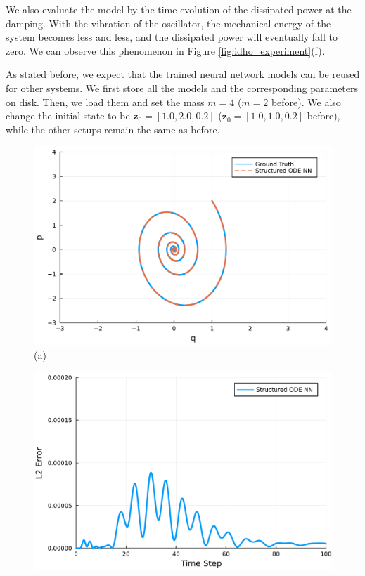 \documentclass[
	parskip, 			   %
	twoside, 			   %
	DIV=14, 			   %
	BCOR=15.0mm, 		   %
	headsepline, 		   %
	open=right, 		   %
	captions=tableheading, %
	bibliography=totoc,    %
	numbers=noenddot       %
]{scrreprt}
\begin{document}
We also evaluate the model by the time evolution of the dissipated power at the damping. With the vibration of the oscillator, the mechanical energy of the system becomes less and less, and the dissipated power will eventually fall to zero. We can observe this phenomenon in Figure \ref{fig:idho_experiment}(f).

As stated before, we expect that the trained neural network models can be reused for other systems. We first store all the models and the corresponding parameters on disk. Then, we load them and set the mass $m=4$ ($m=2$ before). We also change the initial state to be $\mathbf{z}_{0} = [1.0, 2.0, 0.2]$ ($\mathbf{z}_{0} = [1.0, 1.0, 0.2]$ before), while the other setups remain the same as before.

\begin{figure}[h!]
    \centering
    \begin{minipage}{.3\textwidth}
    \centering
    \includegraphics[width=1\linewidth]{figures/phase_portrait_compositional_idho_reuse.pdf}
    \\(a)
    \end{minipage}%
    \begin{minipage}{.3\textwidth}
    \centering
    \includegraphics[width=1\linewidth]{figures/prediction_error_compositional_idho_reuse.pdf}

\end{minipage}
\end{figure}
\end{document}
